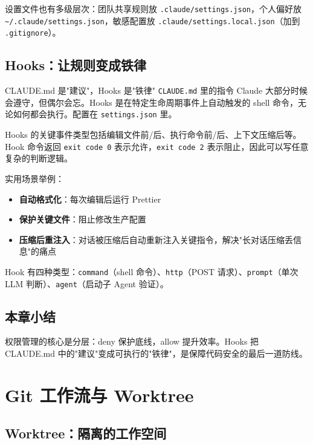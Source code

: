 \documentclass[a4paper]{article}
\begin{document}
设置文件也有多级层次：团队共享规则放 \texttt{.claude/settings.json}，个人偏好放 \texttt{\textasciitilde/.claude/settings.json}，敏感配置放 \texttt{.claude/settings.local.json}（加到 \texttt{.gitignore}）。

\subsection{Hooks：让规则变成铁律}

\begin{warningbox}{CLAUDE.md 是"建议"，Hooks 是"铁律"}
\texttt{CLAUDE.md} 里的指令 Claude 大部分时候会遵守，但偶尔会忘。Hooks 是在特定生命周期事件上自动触发的 shell 命令，无论如何都会执行。配置在 \texttt{settings.json} 里。
\end{warningbox}

Hooks 的关键事件类型包括编辑文件前/后、执行命令前/后、上下文压缩后等。Hook 命令返回 \texttt{exit code 0} 表示允许，\texttt{exit code 2} 表示阻止，因此可以写任意复杂的判断逻辑。

实用场景举例：

\begin{itemize}[leftmargin=1.5em]
  \item \textbf{自动格式化}：每次编辑后运行 Prettier
  \item \textbf{保护关键文件}：阻止修改生产配置
  \item \textbf{压缩后重注入}：对话被压缩后自动重新注入关键指令，解决"长对话压缩丢信息"的痛点
\end{itemize}

Hook 有四种类型：\texttt{command}（shell 命令）、\texttt{http}（POST 请求）、\texttt{prompt}（单次 LLM 判断）、\texttt{agent}（启动子 Agent 验证）。

\subsection{本章小结}

权限管理的核心是分层：deny 保护底线，allow 提升效率。Hooks 把 CLAUDE.md 中的"建议"变成可执行的"铁律"，是保障代码安全的最后一道防线。

\section{Git 工作流与 Worktree}

\subsection{Worktree：隔离的工作空间}
\end{document}
